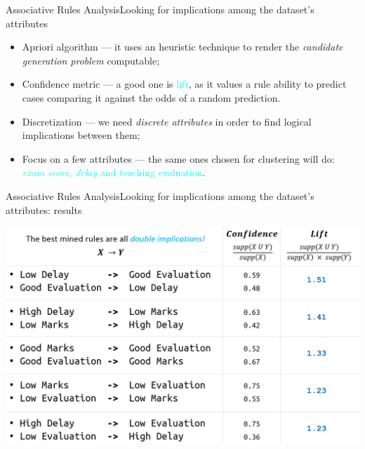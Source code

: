 \begin{frame}{Associative Rules Analysis}{Looking for implications among the dataset's attributes}
\vspace{0,2cm}
 \vspace{0,2cm}

	\begin{block}{}
		\begin{itemize}
			\item<1-> \alert{Apriori algorithm} --- it uses an heuristic technique to render the \emph{candidate generation problem} computable;\vspace{0.2cm}
			\item<2-> \alert{Confidence metric} --- a good one is \textcolor{cyan}{lift}, as it values a rule ability to predict cases comparing it against the odds of a random prediction.
            \item<3-> \alert{Discretization} --- we need \emph{discrete attributes} in order to find logical implications between them;\vspace{0.2cm}
            \item<4-> \alert{Focus on a few attributes} --- the same ones chosen for clustering will do: \textcolor{cyan}{\emph{exam score}, \textcolor{cyan}{\emph{delay} and \textcolor{cyan}{teaching evaluation}}}.
		\end{itemize}
	\end{block}

\end{frame}

\begin{frame}{Associative Rules Analysis}{Looking for implications among the dataset's attributes: results}

\vspace{1mm}
\noindent\hspace{-5mm}\includegraphics[scale=0.26]{ass6.png}

\end{frame}
